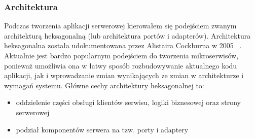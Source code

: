 \subsubsection{Architektura}
Podczas tworzenia aplikacji serwerowej kierowałem się podejściem zwanym architekturą heksagonalną (lub architektura portów i adapterów).
Architektura heksagonalna została udokumentowana przez Alistaira Cockburna w 2005 ~\cite{ref_hex_doc}. Aktualnie jest bardzo popularnym podejściem do tworzenia mikroserwisów, ponieważ umożliwia ona w łatwy sposób rozbudowywanie aktualnego kodu aplikacji, jak i wprowadzanie zmian wynikających ze zmian w architekturze i wymagań systemu.
Główne cechy architektury heksagonalnej to:
\begin{itemize}
  \item oddzielenie części obsługi klientów serwisu, logiki biznesowej oraz strony serwerowej
  \item podział komponentów serwera na tzw. porty i adaptery
\end{itemize}
